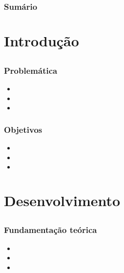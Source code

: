 \documentclass{beamer}
\begin{document}
\begin{frame}
	\frametitle{Sumário}
  	\tableofcontents
\end{frame}


\section{Introdução}
\subsection*{}

\begin{frame}
	\frametitle{Problemática}

	\begin{itemize}
		\item
		\item
		\item
	\end{itemize}
\end{frame}

\begin{frame}
	\frametitle{Objetivos}

	\begin{itemize}
		\item
		\item
		\item
	\end{itemize}
\end{frame}

\section{Desenvolvimento}
\subsection*{}

\begin{frame}
	\frametitle{Fundamenta\c cão teórica}

	\begin{itemize}
		\item
		\item
		\item
	\end{itemize}
\end{frame}
\end{document}
